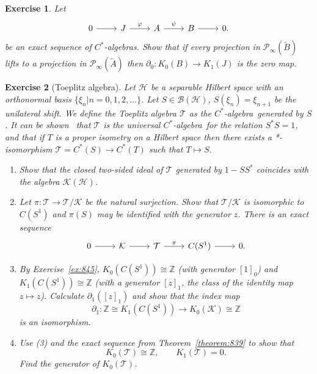 \documentclass{book}
\newtheorem{exercise}{Exercise}[section]
\def\cstar{\(C^*\)-algebra}
\def\cstars{\(C^*\)-algebras}
\begin{document}
\begin{exercise}\label{ex:847}
  Let 
  \[
    \begin{tikzcd}
      0\arrow[r]&J\arrow[r,"\varphi"]&A\arrow[r,"\psi"]&B\arrow[r]&0.
    \end{tikzcd}
  \]
  be an exact sequence of \cstars. Show that if every projection in \(\mathcal{P}_\infty(\tilde{B})\) lifts to a projection
  in \(\mathcal{P}_\infty(\tilde{A})\) then \(\partial_0:K_0(B)\rightarrow K_1(J)\) is the zero map.
\end{exercise}
\begin{exercise}[Toeplitz algebra]\label{ex:848}
  Let \(\mathcal{H}\) be a separable Hilbert space with an orthonormal basis \(\{\xi_n| n=0,1,2,\ldots\}\).
  Let \(S\in\mathcal{B}(\mathcal{H})\), \(S(\xi_n)=\xi_{n+1}\) be the unilateral shift.
  We define the \textit{Toeplitz algebra} \(\mathcal{T}\) as the \cstar\ generated by \(S\). 
  It can be shown\ \cite[722-726]{CL67} that \(\mathcal{T}\) is the universal \cstar\ for the relation \(S^* S=1\), 
  and that if \(T\) is a \textit{proper isometry} on a Hilbert space then there exists a *-isomorphism \(\mathcal{T}=C^*(S)\rightarrow C^*(T)\)
  such that \(T\mapsto S\).
  \begin{enumerate}
    \item Show that the closed two-sided ideal of \(\mathcal{T}\) generated by \(1-S S^*\) coincides with the algebra \(\mathcal{K}(\mathcal{H})\).
    \item Let \(\pi:\mathcal{T}\rightarrow \mathcal{T}/\mathcal{K}\) be the natural surjection. Show that \(\mathcal{T}/\mathcal{K}\) is isomorphic to \(C(S^1)\) and \(\pi(S)\)
    may be identified with the generator \(z\). There is an exact sequence
    \[
      \begin{tikzcd}
        0\arrow[r]&\mathcal{K}\arrow[r]&\mathcal{T}\arrow[r,"\pi"]&C(S^1)\arrow[r]&0.
      \end{tikzcd}
    \]
    \item By Exercise~\ref{ex:845}, \(K_0(C(S^1))\cong\mathbb{Z}\) (with generator \({[1]}_0\)) and \(K_1(C(S^1))\cong\mathbb{Z}\)
    (with a generator \({[z]}_1\), the class of the identity map \(z\mapsto z\)). Calculate \(\partial_1({[z]}_1)\) and show that the index map
    \[
      \partial_1:\mathbb{Z}\cong K_1(C(S^1))\rightarrow K_0(\mathcal{K})\cong\mathbb{Z}
    \]
    is an isomorphism.
    \item Use (3) and the exact sequence from Theorem~\ref{theorem:839} to show that
    \[
      K_0(\mathcal{T})\cong\mathbb{Z},\qquad K_1(\mathcal{T})=0.
    \]  
    Find the generator of \(K_0(\mathcal{T})\).
  \end{enumerate}
\end{exercise}
\end{document}
